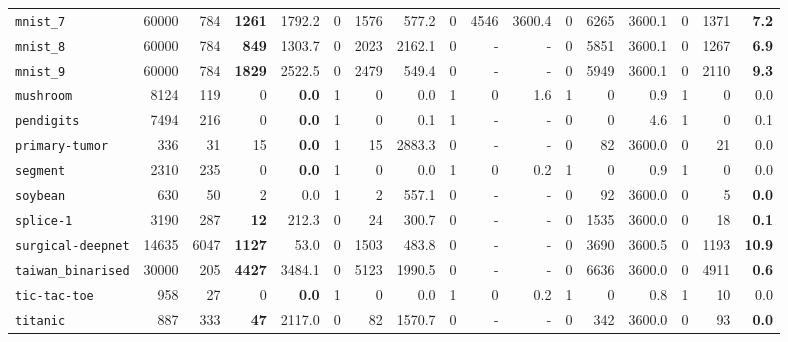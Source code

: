\begin{tabular}{lccrrrrrrrrrrrrrr}
\texttt{mnist\_7} & \multicolumn{1}{r}{60000} & \multicolumn{1}{r}{784}  & \textbf{1261} & 1792.2 & 0 & 1576 & 577.2 & 0 & 4546 & 3600.4 & 0 & 6265 & 3600.1 & 0 & 1371 & \textbf{7.2}\\
\texttt{mnist\_8} & \multicolumn{1}{r}{60000} & \multicolumn{1}{r}{784}  & \textbf{849} & 1303.7 & 0 & 2023 & 2162.1 & 0 & - & - & 0 & 5851 & 3600.1 & 0 & 1267 & \textbf{6.9}\\
\texttt{mnist\_9} & \multicolumn{1}{r}{60000} & \multicolumn{1}{r}{784}  & \textbf{1829} & 2522.5 & 0 & 2479 & 549.4 & 0 & - & - & 0 & 5949 & 3600.1 & 0 & 2110 & \textbf{9.3}\\
\texttt{mushroom} & \multicolumn{1}{r}{8124} & \multicolumn{1}{r}{119}  & 0 & \textbf{0.0} & 1 & 0 & 0.0 & 1 & 0 & 1.6 & 1 & 0 & 0.9 & 1 & 0 & 0.0\\
\texttt{pendigits} & \multicolumn{1}{r}{7494} & \multicolumn{1}{r}{216}  & 0 & \textbf{0.0} & 1 & 0 & 0.1 & 1 & - & - & 0 & 0 & 4.6 & 1 & 0 & 0.1\\
\texttt{primary-tumor} & \multicolumn{1}{r}{336} & \multicolumn{1}{r}{31}  & 15 & \textbf{0.0} & 1 & 15 & 2883.3 & 0 & - & - & 0 & 82 & 3600.0 & 0 & 21 & 0.0\\
\texttt{segment} & \multicolumn{1}{r}{2310} & \multicolumn{1}{r}{235}  & 0 & \textbf{0.0} & 1 & 0 & 0.0 & 1 & 0 & 0.2 & 1 & 0 & 0.9 & 1 & 0 & 0.0\\
\texttt{soybean} & \multicolumn{1}{r}{630} & \multicolumn{1}{r}{50}  & 2 & 0.0 & 1 & 2 & 557.1 & 0 & - & - & 0 & 92 & 3600.0 & 0 & 5 & \textbf{0.0}\\
\texttt{splice-1} & \multicolumn{1}{r}{3190} & \multicolumn{1}{r}{287}  & \textbf{12} & 212.3 & 0 & 24 & 300.7 & 0 & - & - & 0 & 1535 & 3600.0 & 0 & 18 & \textbf{0.1}\\
\texttt{surgical-deepnet} & \multicolumn{1}{r}{14635} & \multicolumn{1}{r}{6047}  & \textbf{1127} & 53.0 & 0 & 1503 & 483.8 & 0 & - & - & 0 & 3690 & 3600.5 & 0 & 1193 & \textbf{10.9}\\
\texttt{taiwan\_binarised} & \multicolumn{1}{r}{30000} & \multicolumn{1}{r}{205}  & \textbf{4427} & 3484.1 & 0 & 5123 & 1990.5 & 0 & - & - & 0 & 6636 & 3600.0 & 0 & 4911 & \textbf{0.6}\\
\texttt{tic-tac-toe} & \multicolumn{1}{r}{958} & \multicolumn{1}{r}{27}  & 0 & \textbf{0.0} & 1 & 0 & 0.0 & 1 & 0 & 0.2 & 1 & 0 & 0.8 & 1 & 10 & 0.0\\
\texttt{titanic} & \multicolumn{1}{r}{887} & \multicolumn{1}{r}{333}  & \textbf{47} & 2117.0 & 0 & 82 & 1570.7 & 0 & - & - & 0 & 342 & 3600.0 & 0 & 93 & \textbf{0.0}\\

\end{tabular}
